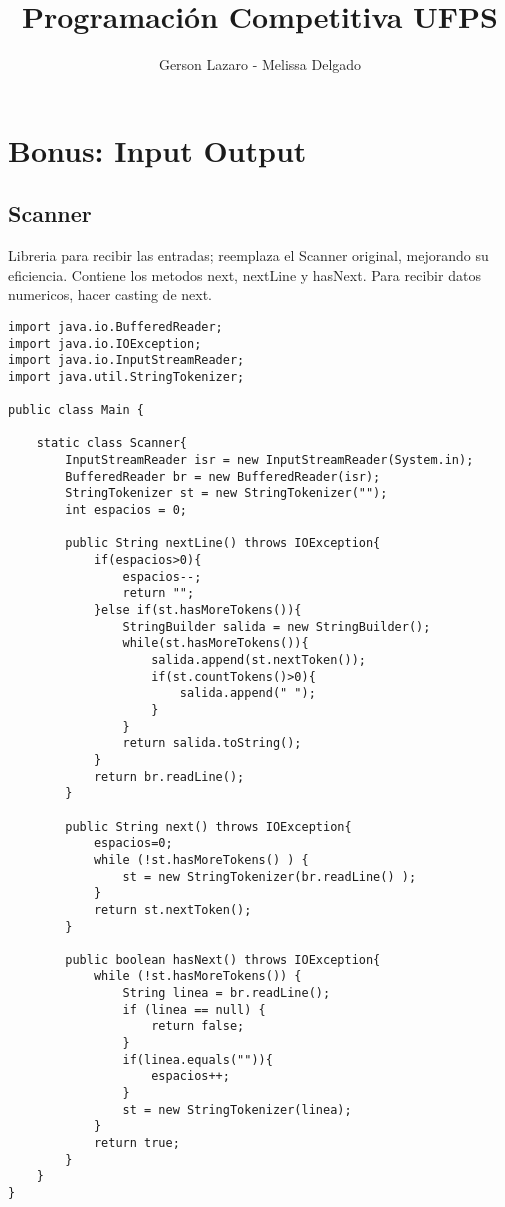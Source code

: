 \documentclass[11pt,letterpaper,twocolumn,twosided]{article}
\begin{document}
\title{Programaci\'on Competitiva UFPS}
\author{Gerson Lazaro - Melissa Delgado}
\maketitle
\tableofcontents
{}


\section{Bonus: Input Output}

\subsection{Scanner}

Libreria para recibir las entradas; reemplaza el Scanner original, mejorando su eficiencia. 
Contiene los metodos next, nextLine y hasNext. Para recibir datos numericos, hacer casting de next.

\begin{lstlisting}
import java.io.BufferedReader;
import java.io.IOException;
import java.io.InputStreamReader;
import java.util.StringTokenizer;

public class Main {

    static class Scanner{
        InputStreamReader isr = new InputStreamReader(System.in);
        BufferedReader br = new BufferedReader(isr);
        StringTokenizer st = new StringTokenizer("");
        int espacios = 0;

        public String nextLine() throws IOException{
        	if(espacios>0){
            	espacios--;
            	return "";
            }else if(st.hasMoreTokens()){
                StringBuilder salida = new StringBuilder();
                while(st.hasMoreTokens()){
                    salida.append(st.nextToken());
                    if(st.countTokens()>0){
                        salida.append(" ");
                    }
                }
                return salida.toString();
            }
            return br.readLine();
        }

        public String next() throws IOException{
        	espacios=0;
            while (!st.hasMoreTokens() ) {
                st = new StringTokenizer(br.readLine() );
            }
            return st.nextToken();
        }

        public boolean hasNext() throws IOException{
            while (!st.hasMoreTokens()) {
                String linea = br.readLine();
                if (linea == null) {
                    return false;
                }
                if(linea.equals("")){
                	espacios++;
                }
                st = new StringTokenizer(linea);
            }
            return true;
        }
    }
}
\end{lstlisting}
\end{document}
